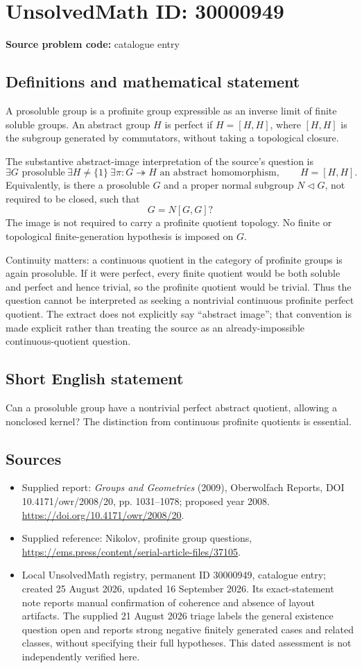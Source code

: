 \documentclass[11pt]{article}
\begin{document}
\section*{UnsolvedMath ID: 30000949}
\textbf{Source problem code:} catalogue entry
\subsection{Definitions and mathematical statement}
A prosoluble group is a profinite group expressible as an inverse limit of finite soluble groups. An abstract group $H$ is perfect if $H=[H,H]$, where $[H,H]$ is the subgroup generated by commutators, without taking a topological closure.

The substantive abstract-image interpretation of the source's question is
\[
\exists G\text{ prosoluble}\ \exists H\ne\{1\}\ \exists\pi:G\twoheadrightarrow H
\text{ an abstract homomorphism},\qquad H=[H,H].
\]
Equivalently, is there a prosoluble $G$ and a proper normal subgroup $N\lhd G$, not required to be closed, such that
\[
G=N[G,G]?
\]
The image is not required to carry a profinite quotient topology. No finite or topological finite-generation hypothesis is imposed on $G$.

Continuity matters: a continuous quotient in the category of profinite groups is again prosoluble. If it were perfect, every finite quotient would be both soluble and perfect and hence trivial, so the profinite quotient would be trivial. Thus the question cannot be interpreted as seeking a nontrivial continuous profinite perfect quotient. The extract does not explicitly say ``abstract image''; that convention is made explicit rather than treating the source as an already-impossible continuous-quotient question.
\subsection{Short English statement}
Can a prosoluble group have a nontrivial perfect abstract quotient, allowing a nonclosed kernel? The distinction from continuous profinite quotients is essential.
\subsection{Sources}
\begin{itemize}
\item Supplied report: \emph{Groups and Geometries} (2009), Oberwolfach Reports, DOI 10.4171/owr/2008/20, pp. 1031--1078; proposed year 2008. \url{https://doi.org/10.4171/owr/2008/20}.
\item Supplied reference: Nikolov, profinite group questions, \url{https://ems.press/content/serial-article-files/37105}.
\item Local UnsolvedMath registry, permanent ID 30000949, catalogue entry; created 25 August 2026, updated 16 September 2026. Its exact-statement note reports manual confirmation of coherence and absence of layout artifacts. The supplied 21 August 2026 triage labels the general existence question open and reports strong negative finitely generated cases and related classes, without specifying their full hypotheses. This dated assessment is not independently verified here.
\end{itemize}
\end{document}

